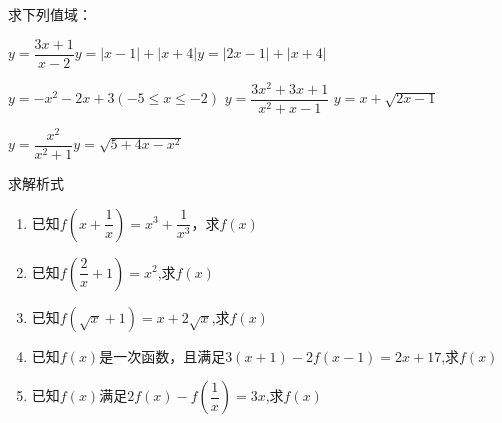 \begin{example} 求下列值域：\par
	$y=\dfrac{3x+1}{x-2}$\hfil $y=|x-1|+|x+4|$\hfil $y=|2x-1|+|x+4|$ \par
	\vspace{2.3cm}
	$y=-x^2-2x+3(-5\leq x \leq -2)$ \hfil $y=\dfrac{3x^2+3x+1}{x^2+x-1}$ \hfil $y=x+\sqrt{2x-1}$
	\par
	\vspace{2.3cm}
		$y=\dfrac{x^2}{x^2+1}$\hfil $y=\sqrt{5+4x-x^2}$
		\vspace{2.5cm}
\end{example}
\newpage
\begin{example} 求解析式
	\begin{enumerate}
	\item  已知$f(x+\dfrac{1}{x})=x^3+\dfrac{1}{x^3}$，求$f(x)$
	\vspace{2.5cm}
	\item 已知$f(\dfrac{2}{x}+1)=x^2$,求$f(x)$
	\vspace{2.5cm}
	\item 已知$f(\sqrt{x}+1)=x+2\sqrt{x}$,求$f(x)$
	\vspace{2.5cm}
	\item 已知$f(x)$是一次函数，且满足$3(x+1)-2f(x-1)=2x+17$,求$f(x)$
	\vspace{2.5cm}
	\item 已知$f(x)$满足$2f(x)-f(\dfrac{1}{x})=3x$,求$f(x)$
		\end{enumerate}
\end{example}
